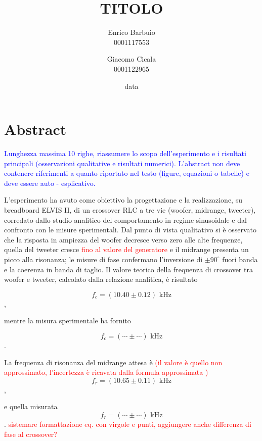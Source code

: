 \documentclass[12pt,italian]{article}
\title{TITOLO}
\author{Enrico Barbuio \\ 0001117553 \and Giacomo Cicala \\ 0001122965}
\date{data}
\newcommand{\prof}[1]{\textcolor{blue}{#1}}
\newcommand{\err}[1]{\textcolor{red}{#1}}
\begin{document}
\maketitle
\section*{Abstract}
\prof{ Lunghezza massima 10 righe, riassumere lo scopo dell'esperimento e i
	risultati principali (osservazioni qualitative e risultati numerici).
	L'abstract non deve contenere riferimenti a quanto riportato nel testo
	(figure, equazioni o tabelle) e deve essere auto - esplicativo. }

L'esperimento ha avuto come obiettivo la progettazione e la realizzazione, su
breadboard ELVIS II, di un crossover RLC a tre vie (woofer, midrange, tweeter),
corredato dallo studio analitico del comportamento in regime sinusoidale e dal
confronto con le misure sperimentali. Dal punto di vista qualitativo si è
osservato che la risposta in ampiezza del woofer decresce verso zero alle alte
frequenze, quella del tweeter cresce \err{fino al valore del generatore} e il
midrange presenta un picco alla risonanza; le misure di fase confermano
l'inversione di $ \pm 90^\circ $ fuori banda e la coerenza in banda di taglio.
Il valore teorico della frequenza di crossover tra woofer e tweeter, calcolato
dalla relazione analitica, è risultato

\begin{equation*}
	f_{c} = (10.40 \pm 0.12)  \text{ kHz}
\end{equation*},

\noindent
mentre la misura sperimentale ha fornito

\begin{equation*}
	f_{c} = (\cdots \pm \cdots) \text{ kHz}
\end{equation*}.

\noindent
La frequenza di risonanza del midrange attesa è \err{(il valore è quello non approssimato, l'incertezza è ricavata dalla formula approssimata )}
\begin{equation*}
	f_{r} = (10.65 \pm 0.11)  \text{ kHz}
\end{equation*},

\noindent
e quella misurata
\begin{equation*}
	f_{r} = (\cdots \pm \cdots)  \text{ kHz}
\end{equation*}.
\err{sistemare formattazione eq. con virgole e punti, aggiungere anche differenza di fase al crossover?}
\end{document}

